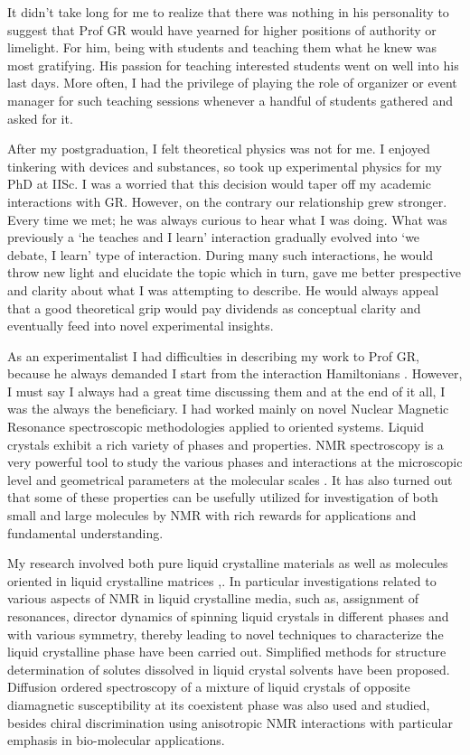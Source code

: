 It didn't take long for me to realize that there was nothing in his personality to
suggest that Prof GR would have yearned for higher positions of authority or
limelight. For him, being with students and teaching them what he knew was most
gratifying. His passion for teaching interested students went on well into his last
days. More often, I had the privilege of playing the role of organizer or event
manager for such teaching sessions whenever a handful of students gathered and
asked for it.

After my postgraduation, I felt theoretical physics was not for me. I enjoyed
tinkering with devices and substances, so took up experimental physics for my
PhD at IISc. I was a worried that this decision would taper off my academic
interactions with GR. However, on the contrary our relationship grew stronger.
Every time we met; he was always curious to hear what I was doing. What was
previously a `he teaches and I learn' interaction gradually evolved into `we
debate, I learn' type of interaction. During many such interactions, he would
throw new light and elucidate the topic which in turn, gave me better prespective
and clarity about what I was attempting to describe. He would always appeal that
a good theoretical grip would pay dividends as conceptual clarity and eventually
feed into novel experimental insights.

As an experimentalist I had difficulties in describing my work to Prof GR,
because he always demanded I start from the interaction Hamiltonians \cite{chap22-key1}.
However, I must say I always had a great time discussing them and at the end of
it all, I was the always the beneficiary. I had worked mainly on novel Nuclear
Magnetic Resonance spectroscopic methodologies applied to oriented systems.
Liquid crystals exhibit a rich variety of phases and properties. NMR spectroscopy
is a very powerful tool to study the various phases and interactions at the
microscopic level and geometrical parameters at the molecular scales \cite{chap22-key2}. It has
also turned out that some of these properties can be usefully utilized for
investigation of both small and large molecules by NMR with rich rewards for
applications and fundamental understanding.

My research involved both pure liquid crystalline materials as well as molecules
oriented in liquid crystalline matrices \cite{chap22-key3},\cite{chap22-key16}. In particular investigations related
to various aspects of NMR in liquid crystalline media, such as, assignment of
resonances, director dynamics of spinning liquid crystals in different phases and
with various symmetry, thereby leading to novel techniques to characterize the
liquid crystalline phase have been carried out. Simplified methods for structure
determination of solutes dissolved in liquid crystal solvents have been proposed.
Diffusion ordered spectroscopy of a mixture of liquid crystals of opposite
diamagnetic susceptibility at its coexistent phase was also used and studied,
besides chiral discrimination using anisotropic NMR interactions with particular
emphasis in bio-molecular applications.

